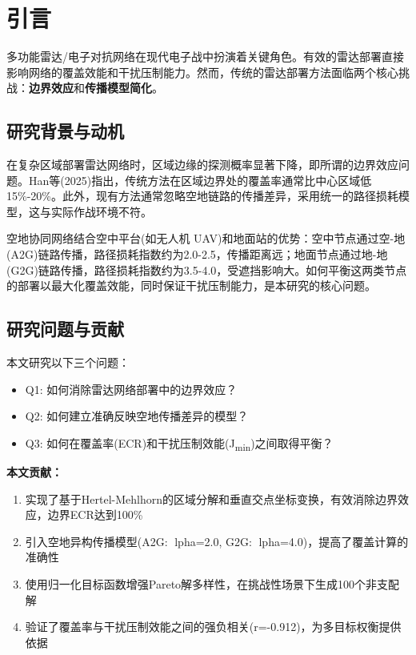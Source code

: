 \section{引言}
\label{sec:introduction}

多功能雷达/电子对抗网络在现代电子战中扮演着关键角色。有效的雷达部署直接影响网络的覆盖效能和干扰压制能力。然而，传统的雷达部署方法面临两个核心挑战：\textbf{边界效应}和\textbf{传播模型简化}。

\subsection{研究背景与动机}

在复杂区域部署雷达网络时，区域边缘的探测概率显著下降，即所谓的边界效应问题。Han等(2025)指出，传统方法在区域边界处的覆盖率通常比中心区域低15\%-20\%。此外，现有方法通常忽略空地链路的传播差异，采用统一的路径损耗模型，这与实际作战环境不符。

空地协同网络结合空中平台(如无人机 UAV)和地面站的优势：空中节点通过空-地(A2G)链路传播，路径损耗指数约为2.0-2.5，传播距离远；地面节点通过地-地(G2G)链路传播，路径损耗指数约为3.5-4.0，受遮挡影响大。如何平衡这两类节点的部署以最大化覆盖效能，同时保证干扰压制能力，是本研究的核心问题。

\subsection{研究问题与贡献}

本文研究以下三个问题：
\begin{itemize}
    \item Q1: 如何消除雷达网络部署中的边界效应？
    \item Q2: 如何建立准确反映空地传播差异的模型？
    \item Q3: 如何在覆盖率(ECR)和干扰压制效能(J\textsubscript{min})之间取得平衡？
\end{itemize}

\textbf{本文贡献：}
\begin{enumerate}
    \item 实现了基于Hertel-Mehlhorn的区域分解和垂直交点坐标变换，有效消除边界效应，边界ECR达到100\%
    \item 引入空地异构传播模型(A2G: lpha=2.0, G2G: lpha=4.0)，提高了覆盖计算的准确性
    \item 使用归一化目标函数增强Pareto解多样性，在挑战性场景下生成100个非支配解
    \item 验证了覆盖率与干扰压制效能之间的强负相关(r=-0.912)，为多目标权衡提供依据
\end{enumerate}

